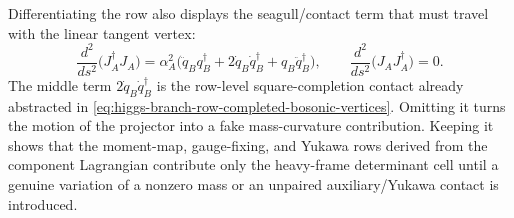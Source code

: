 \begin{example}
Differentiating the row also displays the seagull/contact term that must travel
with the linear tangent vertex:
\begin{equation}
  \frac{d^2}{ds^2}\bigl(J_A^\dagger J_A\bigr)
  =
  \alpha_A^2
  \bigl(
    \ddot q_B q_B^\dagger
    +2\dot q_B\dot q_B^\dagger
    +q_B\ddot q_B^\dagger
  \bigr),
  \qquad
  \frac{d^2}{ds^2}\bigl(J_AJ_A^\dagger\bigr)=0 .
  \label{eq:higgs-branch-row-jacobian-contact}
\end{equation}
The middle term \(2\dot q_B\dot q_B^\dagger\) is the row-level
square-completion contact already abstracted in
\eqref{eq:higgs-branch-row-completed-bosonic-vertices}.  Omitting it turns the
motion of the projector into a fake mass-curvature contribution.  Keeping it
shows that the moment-map, gauge-fixing, and Yukawa rows derived from the
component Lagrangian contribute only the heavy-frame determinant cell until a
genuine variation of a nonzero mass or an unpaired auxiliary/Yukawa contact is
introduced.
\end{example}

